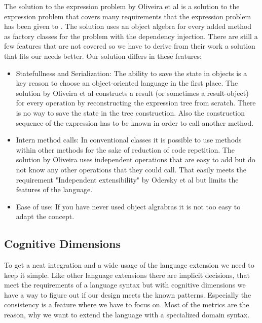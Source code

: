 \documentclass{report}
\begin{document}
The solution to the expression problem by Oliveira et al \cite{Oliv-Extensibility-2012} is a solution to the expression problem that covers many requirements that the expression problem has been given to \cite{Wadler-Expression-1998, Odersky-Expression-2005}. The solution uses an object algebra for every added method as factory classes for the problem with the dependency injection. There are still a few features that are not covered so we have to derive from their work a solution that fits our needs better. Our solution differs in these features:

\begin{itemize}
\item Statefullness and Serialization: The ability to save the state in objects is a key reason to choose an object-oriented language in the first place. The solution by Oliveira et al \cite{Oliv-Extensibility-2012} constructs a result (or sometimes a result-object) for every operation by reconstructing the expression tree from scratch. There is no way to save the state in the tree construction. Also the construction sequence of the expression has to be known in order to call another method.

\item Intern method calls: In conventional classes it is possible to use methods within other methods for the sake of reduction of code repetition. The solution by Oliveira uses independent operations that are easy to add but do not know any other operations that they could call. That easily meets the requirement "Independent extensibility" by Odersky et al \cite{Odersky-Expression-2005} but limits the features of the language.

\item Ease of use: If you have never used object algrabras it is not too easy to adapt the concept.
\end{itemize}

\subsection{Cognitive Dimensions}

To get a neat integration and a wide usage of the language extension we need to keep it simple. Like other language extensions there are implicit decisions, that meet the requirements of a language syntax but with cognitive dimensions \cite{Green-Cognitive-1996} we have a way to figure out if our design meets the known patterns. Especially the consistency is a feature where we have to focus on. Most of the metrics are the reason, why we want to extend the language with a specialized domain syntax.
 
\end{document}
